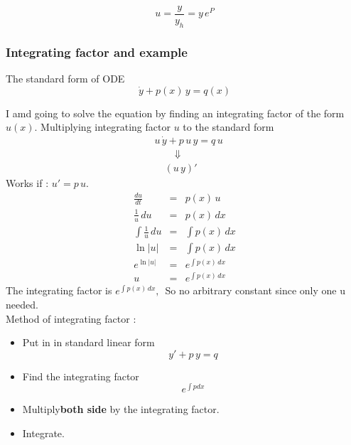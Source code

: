 \begin{equation*}
  u = \frac{y}{y_h} = y\, e^{P}
\end{equation*}

\subsubsection{Integrating factor and example}
The standard form of ODE
\begin{equation*}
  \dot{y} + p(x)\,y = q(x) 
\end{equation*}

I amd going to solve the equation by finding an integrating factor of the form
$u(x)$.
Multiplying integrating factor $u$ to the standard form
\begin{align*}
  &u\, \dot{y} +  p\,  u\, y = q\, u \\
  & \qquad \Downarrow \\
  & \quad (u\, y)'                               
\end{align*}
Works if : $ u' = p\, u$.
\begin{eqnarray*}
  \frac{du}{dt} &=& p(x)\, u \\
  \frac{1}{u}\, du &=& p(x)\, dx \\
  \int \frac{1}{u}\, du &=& \int p(x)\, dx \\
  \ln |u| &=& \int p(x)\, dx \\
  e^{\ln |u|} &=& e^{\int p(x)\, dx} \\
  u &=& e^{\int p(x)\, dx} 
\end{eqnarray*}
The integrating factor is $e^{\int p(x)\, dx}, \, $ So no arbitrary constant since only one u needed.\\

Method of integrating factor :
\begin{itemize}
\item Put in in standard linear form
  \begin{equation*}
    y' + p\, y = q 
  \end{equation*}
\item Find the integrating factor
  \begin{equation*}
    e^{\int p dx}
  \end{equation*}
\item Multiply\textbf{both side} by the integrating factor.
\item Integrate.   
\end{itemize}

